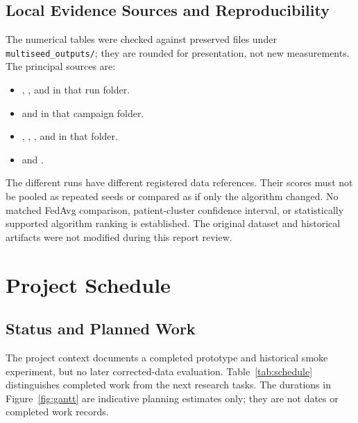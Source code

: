 \documentclass[12pt,a4paper]{report}
\begin{document}
\section{Local Evidence Sources and Reproducibility}
The numerical tables were checked against preserved files under
\texttt{multiseed\_outputs/}; they are rounded for presentation, not new
measurements. The principal sources are:
\begin{itemize}
\item {},
, and  in that run folder.
\item {}
and  in that campaign folder.
\item {},
, , and  in that folder.
\item {} and
.
\end{itemize}
The different runs have different registered data references. Their scores
must not be pooled as repeated seeds or compared as if only the algorithm
changed. No matched FedAvg comparison, patient-cluster confidence interval,
or statistically supported algorithm ranking is established. The original
dataset and historical artifacts were not modified during this report review.

\chapter{Project Schedule}
\section{Status and Planned Work}
The project context documents a completed prototype and historical smoke experiment, but no later corrected-data evaluation. Table~\ref{tab:schedule} distinguishes completed work from the next research tasks. The durations in Figure~\ref{fig:gantt} are indicative planning estimates only; they are not dates or completed work records.
\end{document}
